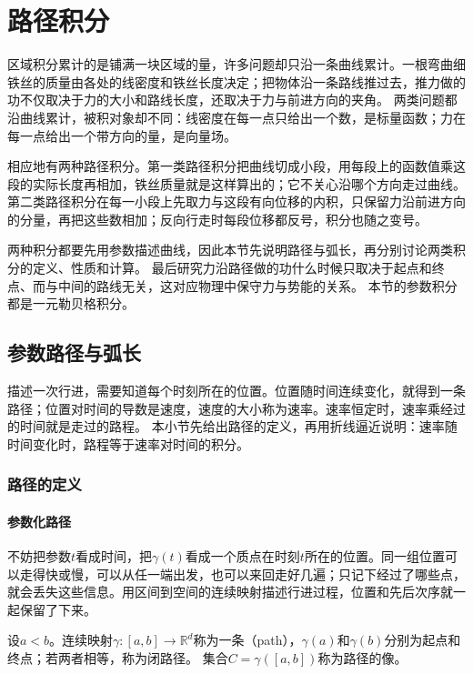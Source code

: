 \par{}
\section{路径积分}
\label{sec:multivariable-path-integration}

区域积分累计的是铺满一块区域的量，许多问题却只沿一条曲线累计。一根弯曲细铁丝的质量由各处的线密度和铁丝长度决定；把物体沿一条路线推过去，推力做的功不仅取决于力的大小和路线长度，还取决于力与前进方向的夹角。
两类问题都沿曲线累计，被积对象却不同：线密度在每一点只给出一个数，是标量函数；力在每一点给出一个带方向的量，是向量场。

相应地有两种路径积分。第一类路径积分把曲线切成小段，用每段上的函数值乘这段的实际长度再相加，铁丝质量就是这样算出的；它不关心沿哪个方向走过曲线。
第二类路径积分在每一小段上先取力与这段有向位移的内积，只保留力沿前进方向的分量，再把这些数相加；反向行走时每段位移都反号，积分也随之变号。

两种积分都要先用参数描述曲线，因此本节先说明路径与弧长，再分别讨论两类积分的定义、性质和计算。
最后研究力沿路径做的功什么时候只取决于起点和终点、而与中间的路线无关，这对应物理中保守力与势能的关系。
本节的参数积分都是一元勒贝格积分。

\subsection{参数路径与弧长}
\label{sec:multivariable-line-integrals}

描述一次行进，需要知道每个时刻所在的位置。位置随时间连续变化，就得到一条路径；位置对时间的导数是速度，速度的大小称为速率。速率恒定时，速率乘经过的时间就是走过的路程。
本小节先给出路径的定义，再用折线逼近说明：速率随时间变化时，路程等于速率对时间的积分。

\subsubsection{路径的定义}

\paragraph{参数化路径}

不妨把参数$t$看成时间，把$\gamma(t)$看成一个质点在时刻$t$所在的位置。同一组位置可以走得快或慢，可以从任一端出发，也可以来回走好几遍；只记下经过了哪些点，就会丢失这些信息。用区间到空间的连续映射描述行进过程，位置和先后次序就一起保留了下来。
\begin{definition}[路径]
设$a<b$。连续映射$\gamma:[a,b]\to\mathbb R^d$称为一条（path），$\gamma(a)$和$\gamma(b)$分别为起点和终点；若两者相等，称为闭路径。
集合$C=\gamma([a,b])$称为路径的像。
\end{definition}

